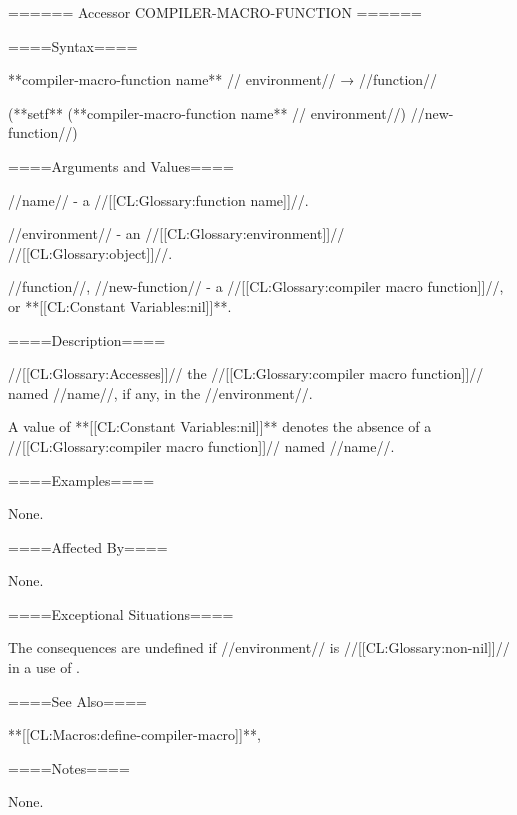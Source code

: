 ====== Accessor COMPILER-MACRO-FUNCTION ======

====Syntax====

**compiler-macro-function {name** //\opt} environment// → //function//

(**setf** (**compiler-macro-function {name** //\opt} environment//) //new-function//)

====Arguments and Values====

//name// - a //[[CL:Glossary:function name]]//.

//environment// - an //[[CL:Glossary:environment]]// //[[CL:Glossary:object]]//.

//function//, //new-function// - a //[[CL:Glossary:compiler macro function]]//, or **[[CL:Constant Variables:nil]]**.

====Description====

//[[CL:Glossary:Accesses]]// the //[[CL:Glossary:compiler macro function]]// named //name//, if any, in the //environment//.

A value of **[[CL:Constant Variables:nil]]** denotes the absence of a //[[CL:Glossary:compiler macro function]]// named //name//.

====Examples====

None.

====Affected By====

None.

====Exceptional Situations====


The consequences are undefined if //environment// is //[[CL:Glossary:non-nil]]// in a use of .

====See Also====

**[[CL:Macros:define-compiler-macro]]**, {\secref\CompilerMacros}

====Notes====

None.

  
